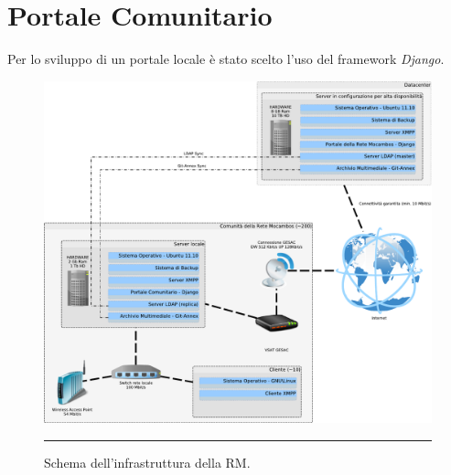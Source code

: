 \section{Portale Comunitario}
Per lo sviluppo di un portale locale è stato scelto l'uso del framework \emph{Django}.

\begin{figure}[htbp]
  \centering
  \includegraphics[width=\textwidth]{./Figure/SchemaServer_ReteMocambos-crop.pdf}
  \rule{35em}{0.5pt}
  \caption[Schema dell'infrastruttura della RM]{Schema dell'infrastruttura della RM.}
  \label{fig:SchemaServer_ReteMocambos}
\end{figure}
